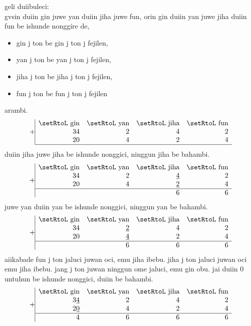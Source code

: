 \documentclass{report}
\begin{document}
\newpage
geli duiibuleci: \\
gvsin duiin gin juwe yan duiin jiha juwe fun, orin gin duiin yan juwe jiha duiin fun be ishunde nonggire de,
\begin{itemize}
    \item gin j ton be gin j ton j fejilen,
    \item yan j ton be yan j ton j fejilen,
    \item jiha j ton be jiha j ton j fejilen,
    \item fun j ton be fun j ton j fejilen
\end{itemize}
arambi.
\[
    +\begin{array}{|rrrr}
        \text{\setRtoL gin} & \text{\setRtoL yan} & \text{\setRtoL jiha} & \text{\setRtoL fun}\\
        34 & 2 & 4 & 2\\
        20 & 4 & 2 & 4\\\hline
    \end{array}
\]
duiin jiha juwe jiha be ishunde nonggici, ninggun jiha be bahambi.
\[
    +\begin{array}{|rrrr}
        \text{\setRtoL gin} & \text{\setRtoL yan} & \text{\setRtoL jiha} & \text{\setRtoL fun}\\
        34 & 2 & \underline{4} & {2}\\
        20 & 4 & \underline{2} & {4}\\\hline
        & & 6 & 6
    \end{array}
\]
juwe yan duiin yan be ishunde nonggici, ninggun yan be bahambi.
\[
    +\begin{array}{|rrrr}
        \text{\setRtoL gin} & \text{\setRtoL yan} & \text{\setRtoL jiha} & \text{\setRtoL fun}\\
        34 & \underline{2} & 4 & {2}\\
        20 & \underline{4} & 2 & {4}\\\hline
        & 6 & 6 & 6
    \end{array}
\]
aiikabade fun j ton jaluci juwan oci, emu jiha ibebu. jiha j ton jaluci juwan oci emu jiha ibebu. jang j ton juwan ninggun ome jaluci, emu gin obu. jai duiin 0 untuhun be ishunde nonggici, duiin be bahambi.
\[
    +\begin{array}{|rrrr}
        \text{\setRtoL gin} & \text{\setRtoL yan} & \text{\setRtoL jiha} & \text{\setRtoL fun}\\
        3\underline{4} & {2} & 4 & {2}\\
        2\underline{0} & {4} & 2 & {4}\\\hline
        4 & 6 & 6 & 6
    \end{array}
\]
\end{document}
